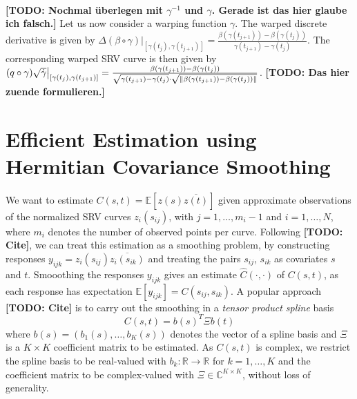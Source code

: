 \paragraph{} 
\textbf{[TODO: Nochmal überlegen mit $\gamma^{-1}$ und $\gamma$. Gerade ist das hier glaube ich falsch.]}
Let us now consider a warping function $\gamma$.
The warped discrete derivative is given by $\Delta (\beta \circ \gamma) \big\rvert_{[\gamma(t_j), \gamma(t_{j+1})]} = \frac{\beta(\gamma(t_{j+1})) - \beta(\gamma(t_{j}))}{\gamma(t_{j+1}) - \gamma(t_j)}$.
The corresponding warped SRV curve is then given by  $(q \circ \gamma) \sqrt{\dot\gamma} \big\rvert_{[\gamma(t_j), \gamma(t_{j+1})]} = \frac{\beta(\gamma(t_{j+1})) - \beta(\gamma(t_j))}{\sqrt{\gamma(t_{j+1}) - \gamma(t_j)} \cdot \sqrt{\lVert\beta(\gamma(t_{j+1})) - \beta(\gamma(t_j))\rVert}}$.
\textbf{[TODO: Das hier zuende formulieren.]}



\section{Efficient Estimation using Hermitian Covariance Smoothing}
\label{sec:cov}

We want to estimate $C(s,t) = \mathbb{E}[z(s)\overline{z(t)}]$ given approximate observations of the normalized SRV curves $z_i(s_{ij})$, with $j = 1,\dots,m_i-1$ and $i=1,\dots,N$, where $m_i$ denotes the number of observed points per curve.
Following \textbf{[TODO: Cite]}, we can treat this estimation as a smoothing problem, by constructing responses $y_{ijk} = z_i(s_{ij}) \overline{z_i(s_{ik})}$ and treating the pairs $s_{ij}$, $s_{ik}$ as covariates $s$ and $t$.
Smooothing the responses $y_{ijk}$ gives an estimate $\hat C(\cdot, \cdot)$ of $C(s,t)$, as each response has expectation $\mathbb{E}[y_{ijk}] = C(s_{ij},s_{ik})$. 
A popular approach \textbf{[TODO: Cite]} is to carry out the smoothing in a \emph{tensor product spline} basis 
$$ C(s,t) = b(s)^T \Xi b(t) $$
where $b(s) = (b_1(s),\dots,b_K(s))$ denotes the vector of a spline basis and $\Xi$ is a $K \times K$ coefficient matrix to be estimated.
As $C(s,t)$ is complex, we restrict the spline basis to be real-valued with $b_k : \mathbb{R} \rightarrow \mathbb{R}$ for $k = 1,\dots,K$ and the coefficient matrix to be complex-valued with $\Xi \in \mathbb{C}^{K \times K}$, without loss of generality.


